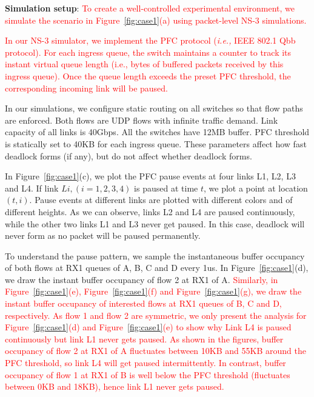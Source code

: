   \textbf{Simulation setup}: \textcolor{red}{To create a well-controlled experimental environment,
 we simulate the scenario in Figure~\ref{fig:case1}(a) using packet-level NS-3 simulations.}

 \textcolor{red}{In our NS-3 simulator, we implement the PFC protocol ({\em i.e.,} IEEE 802.1 Qbb protocol). For each ingress queue, the switch maintains a counter to
 track its instant virtual queue length (i.e., bytes of buffered packets received by this
 ingress queue). Once the queue length exceeds the preset PFC threshold, the corresponding incoming link will be paused.}

In our simulations, we configure static routing on all switches so that flow paths are enforced.
Both flows are UDP flows with infinite traffic demand. Link capacity of
all links is 40Gbps. All the switches have 12MB buffer. PFC threshold is statically set to 40KB for
each ingress queue. These parameters affect how fast deadlock forms (if any), but do not affect whether deadlock forms.

In Figure~\ref{fig:case1}(c), we plot the PFC pause events at four links L1, L2, L3 and L4.
If link $Li, (i=1,2,3,4)$ is paused at time $t$, we plot a point at location $(t, i)$. Pause events at
different links are plotted with different colors and of different heights. As we can observe, links
L2 and L4 are paused continuously, while the other two links L1 and L3 never get paused. In this case,
deadlock will never form as no packet will be paused permanently.

To understand the pause pattern, we sample the instantaneous buffer occupancy of
both flows at RX1 queues of A, B, C and D every 1us. In Figure~\ref{fig:case1}(d), we draw the instant
buffer occupancy of flow 2 at RX1 of A.
\textcolor{red}{Similarly, in Figure~\ref{fig:case1}(e), Figure~\ref{fig:case1}(f) and Figure~\ref{fig:case1}(g), we draw
the instant buffer occupancy of interested flows at RX1 queues of B, C and D, respectively. As
flow 1 and flow 2 are symmetric, we only present the analysis for Figure~\ref{fig:case1}(d) and
Figure~\ref{fig:case1}(e) to show why Link L4 is paused continuously but link L1 never gets paused.
As shown in the figures, buffer occupancy of flow 2 at RX1 of A fluctuates between 10KB
and 55KB around the PFC threshold, so link L4 will get paused intermittently. In contrast, buffer
occupancy of flow 1 at RX1 of B is well below the PFC threshold (fluctuates between 0KB and 18KB),
hence link L1 never gets paused.}

